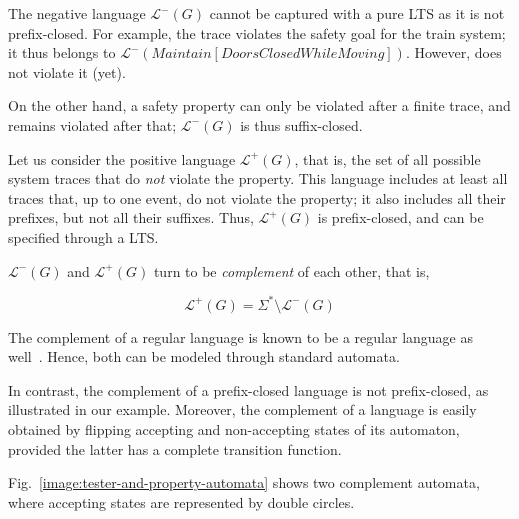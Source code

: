 The negative language $\mathcal{L}^{-}(G)$ cannot be captured with a pure LTS as it is not prefix-closed. For example, the trace  violates the safety goal for the train system; it thus belongs to $\mathcal{L}^{-}(Maintain[DoorsClosed While Moving])$. However,  does not violate it (yet). 

On the other hand, a safety property can only be violated after a finite trace, and remains violated after that; $\mathcal{L}^{-}(G)$ is thus suffix-closed. 

Let us consider the positive language $\mathcal{L}^{+}(G)$, that is, the set of all possible system traces that do \emph{not} violate the property. This language includes at least all traces that, up to one event, do not violate the property; it also includes all their prefixes, but not all their suffixes. Thus, $\mathcal{L}^{+}(G)$ is prefix-closed, and can be specified through a LTS. 

$\mathcal{L}^{-}(G)$ and $\mathcal{L}^{+}(G)$ turn to be \emph{complement} of each other, that is, 

\begin{equation}
\mathcal{L}^{+}(G) = \Sigma^{*} \setminus \mathcal{L}^{-}(G)
\end{equation}

The complement of a regular language is known to be a regular language as well~\cite{Hopcroft:1979}. Hence, both can be modeled through standard automata. 

In contrast, the complement of a prefix-closed language is not prefix-closed, as illustrated in our example. Moreover, the complement of a language is easily obtained by flipping accepting and non-accepting states of its automaton, provided the latter has a complete transition function. 

Fig.~\ref{image:tester-and-property-automata} shows two complement automata, where accepting states are represented by double circles.

